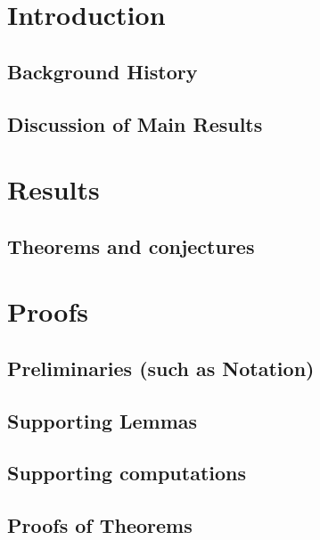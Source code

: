 
\section{ Introduction}
\subsection{ Background History}
\subsection{ Discussion of Main Results}
\section{ Results}
\subsection{ Theorems and conjectures}
\section{ Proofs}
\subsection{ Preliminaries (such as Notation)}
\subsection{Supporting Lemmas}
\subsection{Supporting computations}
\subsection{Proofs of Theorems}
